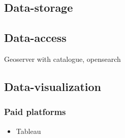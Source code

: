 \subsection{Data-storage}

\subsection{Data-access}
Geoserver with catalogue, opensearch

\subsection{Data-visualization}

\subsubsection{Paid platforms}
\begin{itemize}
    \item Tableau
\end{itemize}